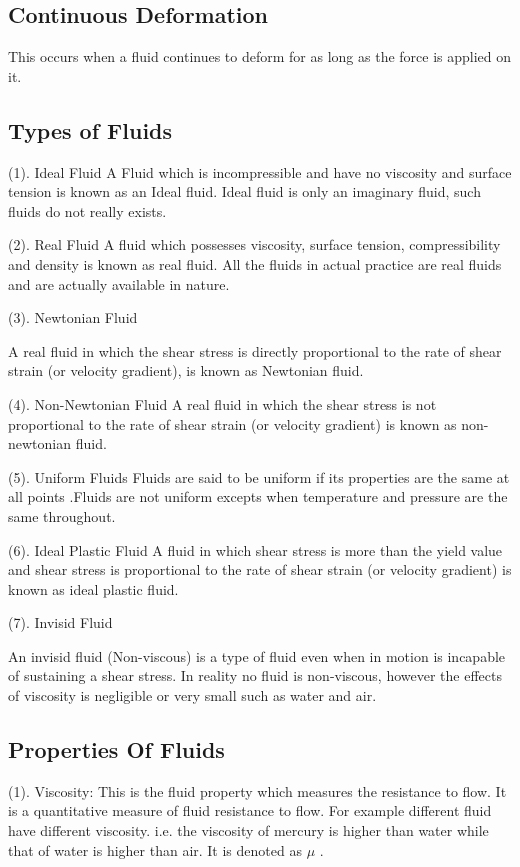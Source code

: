 \documentclass[a4paper, 12pt]{report}
\begin{document}
\subsection{Continuous Deformation}
This occurs when a fluid continues to deform for as long as the force is applied on it.
\subsection{Types of Fluids}
(1).	 Ideal Fluid
A  Fluid which is incompressible and have no viscosity and surface tension is known as an Ideal fluid. Ideal fluid is only an imaginary fluid, such fluids do not really exists.


(2). 	Real Fluid
A fluid which possesses viscosity, surface tension, compressibility and density is known as real fluid. All the fluids in actual practice are real fluids and are actually available in nature.




(3). Newtonian Fluid

A real fluid in which the shear stress is directly proportional to the rate of shear strain (or velocity gradient), is known as Newtonian fluid.

(4). Non-Newtonian Fluid
A real fluid in which the shear stress is not proportional to the rate of shear strain (or velocity gradient) is known as non-newtonian fluid.


(5).  Uniform Fluids 
Fluids are said to be uniform if its properties are the same at all points .Fluids are not uniform excepts when temperature and pressure are the same throughout.


(6).  Ideal Plastic Fluid
A fluid in which shear stress is more than the yield value and shear stress is proportional to the rate of shear strain (or velocity gradient) is known as ideal plastic fluid.



(7).  Invisid Fluid

An invisid fluid (Non-viscous) is a type of fluid even when in motion is incapable of sustaining a shear stress. In reality no fluid is non-viscous, however the effects of viscosity is negligible or very small such as water and air.


\subsection{Properties Of Fluids}
(1).	Viscosity:
 This is the fluid property which measures the resistance to flow. It is a quantitative measure of fluid resistance to flow. For example different fluid have different viscosity. i.e. the viscosity of mercury is higher than water while that of water is higher than air. It is denoted as $\mu$ .
\end{document}
